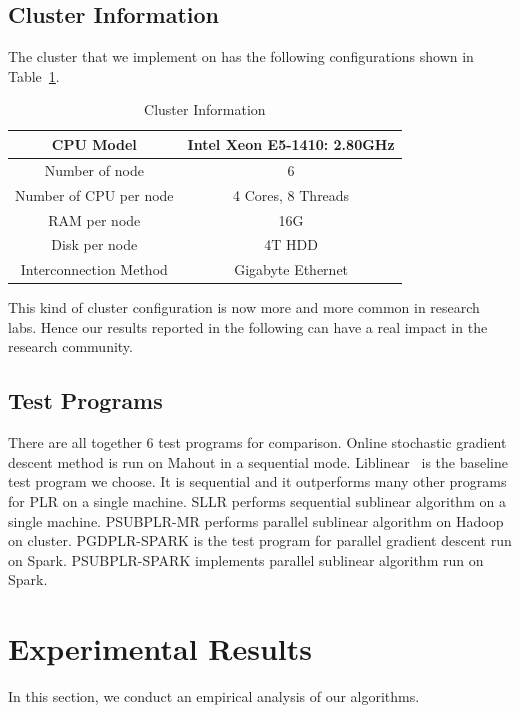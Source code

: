 \documentclass{llncs}
\begin{document}
\subsection{Cluster Information}
The cluster that we implement on has the following configurations shown in Table~\ref{tab:table2}.
\begin{table}[h]
\centering
\caption{Cluster Information}\label{tab:table2}
\begin{tabular}{|c|c|}
\hline
    CPU Model & Intel Xeon E5-1410: 2.80GHz \\
\hline
    Number of node & 6 \\
\hline
    Number of CPU per node & 4 Cores, 8 Threads \\
\hline
    RAM per node & 16G \\
\hline
    Disk per node & 4T HDD\\
\hline
    Interconnection Method & Gigabyte Ethernet  \\
\hline
\end{tabular}
\end{table}
This kind of cluster configuration is now more and more common in research labs. Hence our results reported in the following can have a real impact in the research community.

\subsection{Test Programs}
There are all together 6 test programs for comparison.
Online stochastic gradient descent method is run on Mahout in a sequential mode.
Liblinear~\cite{fan2008liblinear} is the baseline test program we choose. It is sequential and it outperforms many other programs for PLR on a single machine.
SLLR performs sequential sublinear algorithm on a single machine.
PSUBPLR-MR performs parallel sublinear algorithm on Hadoop on cluster.
PGDPLR-SPARK is the test program for parallel gradient descent run on Spark.
PSUBPLR-SPARK implements parallel sublinear algorithm run on Spark.

\section{Experimental Results} \label{sec:experiment}
In this section, we conduct an empirical analysis of our algorithms.
\end{document}
